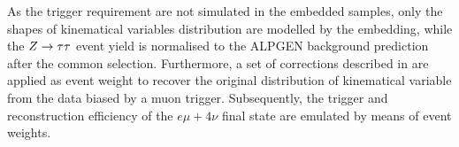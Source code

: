 

As the trigger requirement are  not simulated in the  embedded samples, only the shapes of kinematical variables 
distribution are modelled by the embedding, while the $Z\rightarrow \tau\tau$ event yield is normalised to the ALPGEN \Ztautau background prediction
after the common selection. Furthermore, a set of corrections  described in \cite{SMnew} are
applied as event weight to recover the original \Zmumu distribution of kinematical variable 
from the data biased by a muon trigger. Subsequently,
the trigger and reconstruction efficiency  of the $e \mu +4\nu $ final 
state are emulated by means of event weights.

